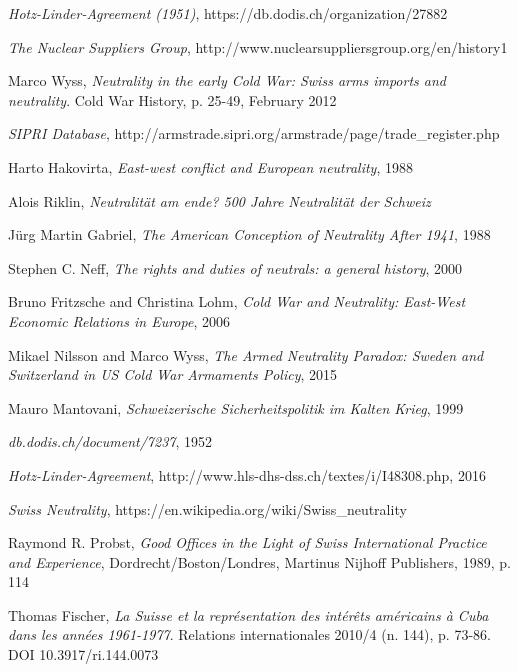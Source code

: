 \documentclass[a4paper]{article}
\begin{document}
\begin{thebibliography}{9}
\label{reference10}
\emph{Hotz-Linder-Agreement (1951)}, https://db.dodis.ch/organization/27882

\label{reference11}
\emph{The Nuclear Suppliers Group}, http://www.nuclearsuppliersgroup.org/en/history1

\label{reference12}
  Marco Wyss, \emph{Neutrality in the early Cold War: Swiss arms imports and neutrality}. Cold War History, p. 25-49, February 2012

\label{reference13}
\emph{SIPRI Database}, http://armstrade.sipri.org/armstrade/page/trade\_register.php

\label{reference14}
Harto Hakovirta, \emph{East-west conflict and European neutrality}, 1988

\label{reference15}
Alois Riklin, \emph{Neutralität am ende? 500 Jahre Neutralität der Schweiz}

\label{reference16}
J\"{u}rg Martin Gabriel, \emph{The American Conception of Neutrality After 1941}, 1988

\label{reference17}
Stephen C. Neff, \emph{The rights and duties of neutrals: a general history}, 2000

\label{reference18}
Bruno Fritzsche and Christina Lohm, \emph{Cold War and Neutrality: East-West Economic Relations in Europe}, 2006

\label{reference19}
Mikael Nilsson and Marco Wyss, \emph{The Armed Neutrality Paradox: Sweden and Switzerland in US Cold War Armaments Policy}, 2015

\label{reference20}
Mauro Mantovani, \emph{Schweizerische Sicherheitspolitik im Kalten Krieg}, 1999

\label{reference20}
\emph{db.dodis.ch/document/7237}, 1952

\label{reference21}
\emph{Hotz-Linder-Agreement}, http://www.hls-dhs-dss.ch/textes/i/I48308.php, 2016

\label{reference22}
\emph{Swiss Neutrality}, https://en.wikipedia.org/wiki/Swiss\_neutrality

Raymond R. Probst, \emph{Good Offices in the Light of Swiss International Practice and Experience}, Dordrecht/Boston/Londres, Martinus Nijhoff Publishers, 1989, p. 114

  Thomas Fischer, \emph{La Suisse et la représentation des intérêts américains à Cuba dans les années 1961-1977}. Relations internationales 2010/4 (n. 144), p. 73-86. DOI 10.3917/ri.144.0073


\end{thebibliography}
\end{document}
